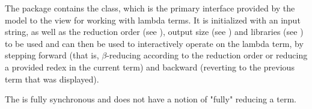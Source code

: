The \texttt{} package contains the \texttt{}
class, which is the primary interface provided by the model to the view for working
with lambda terms. It is initialized with an input string, as well as the reduction
order (see \texttt{}), output size (see \texttt{})
and libraries (see \texttt{}) to be used and can then be used to
interactively operate on the lambda term, by stepping forward (that is, $\beta$-reducing
according to the reduction order or reducing a provided redex in the current term)
and backward (reverting to the previous term that was displayed).

The \texttt{} is fully synchronous and does not have a notion
of "fully" reducing a term.
